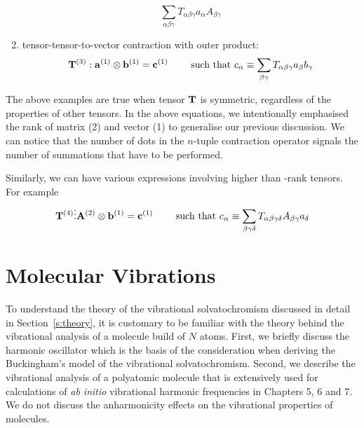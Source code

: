 \documentclass[b5paper,oneside,fleqn,11pt]{book}
\begin{document}
\begin{appendices}
\begin{enumerate}
\begin{equation}
     \sum_{\alpha\beta\gamma} T_{\alpha\beta\gamma} a_{\alpha} A_{\beta\gamma}
   \end{equation}
 \item tensor\hyp{}tensor\hyp{}to\hyp{}vector contraction with outer product:
   \begin{equation}
     {\bf T}^{(3)} : {\bf a}^{(1)} \otimes {\bf b}^{(1)}  = {\bf c}^{(1)}
     \qquad\text{ such that } 
     c_{\alpha} \equiv 
     \sum_{\beta\gamma} T_{\alpha\beta\gamma} a_{\beta} b_{\gamma}
   \end{equation}
\end{enumerate}
%
The above examples are true when tensor ${\bf T}$ is symmetric, regardless
of the properties of other tensors. In the
above equations, we intentionally emphasised the rank of matrix (2)
and vector (1) to generalise our previous discussion.
We can notice that the number of dots in the $n$-tuple contraction operator
signals the number of summations that have to be performed. 

Similarly, we can have various expressions involving higher than \hyp{}rank
tensors. For example
   \begin{equation}
     {\bf T}^{(4)} \vdots {\bf A}^{(2)} \otimes {\bf b}^{(1)}  = {\bf c}^{(1)}
     \qquad\text{ such that } 
     c_{\alpha} \equiv 
     \sum_{\beta\gamma\delta} T_{\alpha\beta\gamma\delta} A_{\beta\gamma} a_{\delta}
   \end{equation}



\chapter{Molecular Vibrations\label{a:vibrational-analysis}}

To understand the theory of the vibrational solvatochromism 
discussed in detail in Section~\ref{s:theory}, it is customary
to be familiar with the theory behind the vibrational analysis
of a molecule build of $N$ atoms. First, we briefly discuss
the harmonic oscillator which is the basis of the consideration
when deriving the Buckingham's model of the vibrational solvatochromism.
Second, we describe the vibrational analysis of a polyatomic molecule
that is extensively used for calculations of \emph{ab initio} vibrational
harmonic frequencies in Chapters 5, 6 and 7. We do not discuss
the anharmonicity effects on the vibrational properties of molecules.


\end{appendices}
\end{document}
